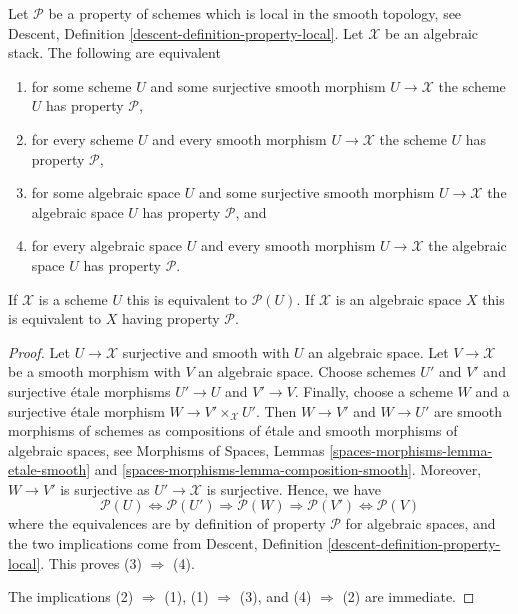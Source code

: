 \begin{lemma}
\label{lemma-type-property}
Let $\mathcal{P}$ be a property of schemes which is local in the smooth
topology, see
Descent, Definition \ref{descent-definition-property-local}.
Let $\mathcal{X}$ be an algebraic stack. The following are equivalent
\begin{enumerate}
\item for some scheme $U$ and some surjective smooth morphism
$U \to \mathcal{X}$ the scheme $U$ has property $\mathcal{P}$,
\item for every scheme $U$ and every smooth morphism $U \to \mathcal{X}$
the scheme $U$ has property $\mathcal{P}$,
\item for some algebraic space $U$ and some surjective smooth morphism
$U \to \mathcal{X}$ the algebraic space $U$ has property $\mathcal{P}$, and
\item for every algebraic space $U$ and every smooth morphism
$U \to \mathcal{X}$ the algebraic space $U$ has property $\mathcal{P}$.
\end{enumerate}
If $\mathcal{X}$ is a scheme $U$ this is equivalent to $\mathcal{P}(U)$.
If $\mathcal{X}$ is an algebraic space $X$ this is equivalent to
$X$ having property $\mathcal{P}$.
\end{lemma}

\begin{proof}
Let $U \to \mathcal{X}$ surjective and smooth with $U$ an algebraic space.
Let $V \to \mathcal{X}$ be a smooth morphism with $V$ an algebraic space.
Choose schemes $U'$ and $V'$ and surjective \'etale morphisms
$U' \to U$ and $V' \to V$. Finally, choose a scheme $W$ and a
surjective \'etale morphism $W \to V' \times_\mathcal{X} U'$.
Then $W \to V'$ and $W \to U'$ are smooth morphisms of schemes
as compositions of \'etale and smooth morphisms of algebraic spaces, see
Morphisms of Spaces, Lemmas \ref{spaces-morphisms-lemma-etale-smooth} and
\ref{spaces-morphisms-lemma-composition-smooth}.
Moreover, $W \to V'$ is surjective as $U' \to \mathcal{X}$ is surjective.
Hence, we have
$$
\mathcal{P}(U) \Leftrightarrow
\mathcal{P}(U') \Rightarrow
\mathcal{P}(W) \Rightarrow
\mathcal{P}(V') \Leftrightarrow \mathcal{P}(V)
$$
where the equivalences are by definition of property $\mathcal{P}$ for
algebraic spaces, and the two implications come from
Descent, Definition \ref{descent-definition-property-local}.
This proves (3) $\Rightarrow$ (4).

\medskip\noindent
The implications (2) $\Rightarrow$ (1), (1) $\Rightarrow$ (3),
and (4) $\Rightarrow$ (2) are immediate.
\end{proof}

